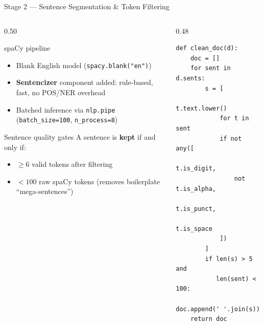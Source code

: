 \documentclass[11pt,aspectratio=169,professionalfonts]{beamer}
\begin{document}
\begin{frame}[fragile]{Stage 2 — Sentence Segmentation \& Token Filtering}
\small
  \begin{columns}[T]
    \begin{column}{0.50\textwidth}
      \begin{block}{spaCy pipeline}
        \begin{itemize}
          \item Blank English model (\texttt{spacy.blank("en")})
          \item \textbf{Sentencizer} component added:
                rule-based, fast, no POS/NER overhead
          \item Batched inference via \texttt{nlp.pipe}
                (\texttt{batch\_size=100},
                 \texttt{n\_process=8})
        \end{itemize}
      \end{block}
      \begin{block}{Sentence quality gates}
        A sentence is \textbf{kept} if and only if:
        \begin{itemize}
          \item $\geq 6$ valid tokens after filtering
          \item $< 100$ raw spaCy tokens (removes
                boilerplate ``mega-sentences'')
        \end{itemize}
      \end{block}
    \end{column}
    \begin{column}{0.48\textwidth}
    \vspace{-.3cm}
\begin{lstlisting}
def clean_doc(d):
    doc = []
    for sent in d.sents:
        s = [
            t.text.lower()
            for t in sent
            if not any([
                t.is_digit,
                not t.is_alpha,
                t.is_punct,
                t.is_space
            ])
        ]
        if len(s) > 5 and 
           len(sent) < 100:
            doc.append(' '.join(s))
    return doc
\end{lstlisting}
    \end{column}
  \end{columns}

\end{frame}
\end{document}
